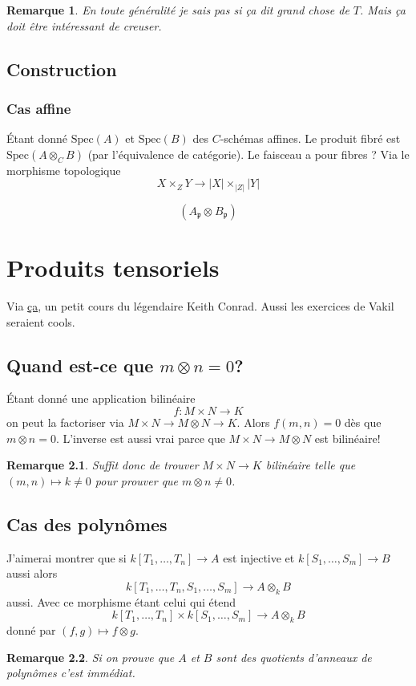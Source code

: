 \documentclass[a4paper,12pt]{book}
\newcommand{\Spec}{\textrm{Spec}}
\newcommand{\p}{\mathfrak{p}}
\newcommand{\q}{\mathfrak{p}}
\theoremstyle{plain}
\newtheorem{rem}{Remarque}
\theoremstyle{definition}
\theoremstyle{remark}
\begin{document}
\begin{rem}
    En toute généralité je sais pas si ça dit grand chose de $T$. Mais
    ça doit être intéressant de creuser.
\end{rem}


\section{Construction}
\subsection{Cas affine}
Étant donné $\Spec(A)$ et $\Spec(B)$ des $C$-schémas affines. Le 
produit fibré est $\Spec(A\otimes_C B)$ (par l'équivalence de 
catégorie). Le faisceau a pour fibres ? Via le morphisme 
topologique 
\[X\times_Z Y\to |X|\times_{|Z|}|Y|\]

\[(A_\p\otimes_{} B_\q)\]
\subsection{}



\chapter{Produits tensoriels}
Via \href{https://kconrad.math.uconn.edu/blurbs/linmultialg/tensorprod.pdf}{ça}, un petit cours du légendaire Keith Conrad.
Aussi les exercices de Vakil seraient cools.
\section{Quand est-ce que $m\otimes n= 0$?}
Étant donné une application bilinéaire 
\[f\colon M\times N\to K\]
on peut la factoriser via $M\times N\to M\otimes N\to K$. Alors
$f(m,n)=0$ dès que $m\otimes n=0$. L'inverse est aussi vrai parce
que $M\times N\to M\otimes N$ est bilinéaire!

\begin{rem}
  Suffit donc de trouver $M\times N\to K$ bilinéaire
  telle que $(m,n)\mapsto k\ne 0$ pour prouver que 
  $m\otimes n\ne 0$.
\end{rem}
\section{Cas des polynômes}
J'aimerai montrer que si $k[T_1,\ldots, T_n]\to A$ est injective
et $k[S_1,\ldots,S_m]\to B$ aussi alors 
\[k[T_1,\ldots,T_n,S_1,\ldots,S_m]\to A\otimes_k B\]
aussi. Avec ce morphisme étant celui qui étend
\[k[T_1,\ldots,T_n]\times k[S_1,\ldots, S_m]\to A\otimes_k B\]
donné par $(f,g)\mapsto f\otimes g$. 
\begin{rem}
  Si on prouve que $A$ et $B$ sont des quotients d'anneaux de 
  polynômes c'est immédiat.
\end{rem}
\end{document}
